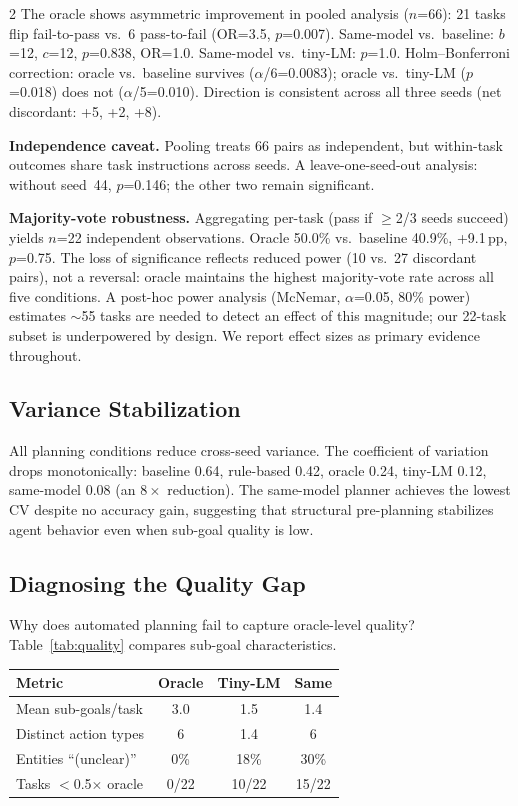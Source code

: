 \documentclass[11pt,a4paper]{article}
\begin{document}
\begin{multicols}{2}
The oracle shows asymmetric improvement in pooled analysis ($n$=66): 21 tasks flip fail-to-pass vs.\ 6 pass-to-fail (OR=3.5, $p$=0.007). Same-model vs.\ baseline: $b$=12, $c$=12, $p$=0.838, OR=1.0. Same-model vs.\ tiny-LM: $p$=1.0. Holm--Bonferroni correction: oracle vs.\ baseline survives ($\alpha$/6=0.0083); oracle vs.\ tiny-LM ($p$=0.018) does not ($\alpha$/5=0.010). Direction is consistent across all three seeds (net discordant: +5, +2, +8).

\textbf{Independence caveat.} Pooling treats 66 pairs as independent, but within-task outcomes share task instructions across seeds. A leave-one-seed-out analysis: without seed~44, $p$=0.146; the other two remain significant.

\textbf{Majority-vote robustness.} Aggregating per-task (pass if $\geq$2/3 seeds succeed) yields $n$=22 independent observations. Oracle 50.0\% vs.\ baseline 40.9\%, +9.1\,pp, $p$=0.75. The loss of significance reflects reduced power (10 vs.\ 27 discordant pairs), not a reversal: oracle maintains the highest majority-vote rate across all five conditions. A post-hoc power analysis (McNemar, $\alpha$=0.05, 80\% power) estimates ${\sim}$55 tasks are needed to detect an effect of this magnitude; our 22-task subset is underpowered by design. We report effect sizes as primary evidence throughout.


\subsection{Variance Stabilization}

All planning conditions reduce cross-seed variance. The coefficient of variation drops monotonically: baseline 0.64, rule-based 0.42, oracle 0.24, tiny-LM 0.12, same-model 0.08 (an $8\times$ reduction). The same-model planner achieves the lowest CV despite no accuracy gain, suggesting that structural pre-planning stabilizes agent behavior even when sub-goal quality is low.


\subsection{Diagnosing the Quality Gap}

Why does automated planning fail to capture oracle-level quality? Table~\ref{tab:quality} compares sub-goal characteristics.

\begin{center}
\small
{}
\label{tab:quality}
\setlength{\tabcolsep}{4pt}
\begin{tabular}{@{}lccc@{}}
\toprule
Metric & Oracle & Tiny-LM & Same \\
\midrule
Mean sub-goals/task & 3.0 & 1.5 & 1.4 \\
Distinct action types & 6 & 1.4 & 6 \\
Entities ``(unclear)'' & 0\% & 18\% & 30\% \\
Tasks $<$0.5$\times$ oracle & 0/22 & 10/22 & 15/22 \\
\bottomrule
\end{tabular}
\end{center}


\end{multicols}
\end{document}
